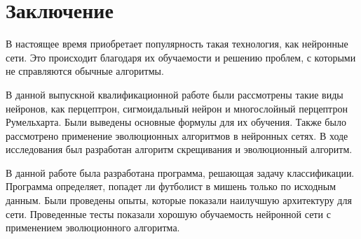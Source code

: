 \newpage

\chapter*{Заключение}

  \indent \indent В настоящее время приобретает популярность такая технология, как нейронные сети. Это происходит благодаря их обучаемости и решению проблем, с которыми не справляются обычные алгоритмы.

  В данной выпускной квалификационной работе были рассмотрены такие виды нейронов, как перцептрон, сигмоидальный нейрон и многослойный перцептрон Румельхарта. Были выведены основные формулы для их обучения. Также было рассмотрено применение эволюционных алгоритмов в нейронных сетях. В ходе исследования был разработан алгоритм скрещивания и эволюционный алгоритм.

  В данной работе была разработана программа, решающая задачу классификации. Программа определяет, попадет ли футболист в мишень только по исходным данным. Были проведены опыты, которые показали наилучшую архитектуру для сети. Проведенные тесты показали хорошую обучаемость нейронной сети с применением эволюционного алгоритма.